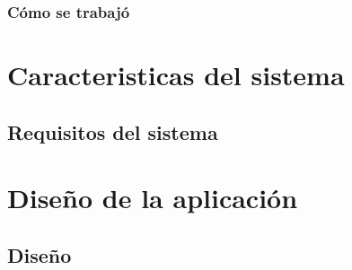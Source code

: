 \documentclass{iccmemoria}
\begin{document}
		\subsection{Cómo se trabajó}
	
\chapter{Caracteristicas del sistema}
	\section{Requisitos del sistema}
	

\chapter{Diseño de la aplicación}
	\section{Diseño}
	





	












%

%

%
\end{document}
